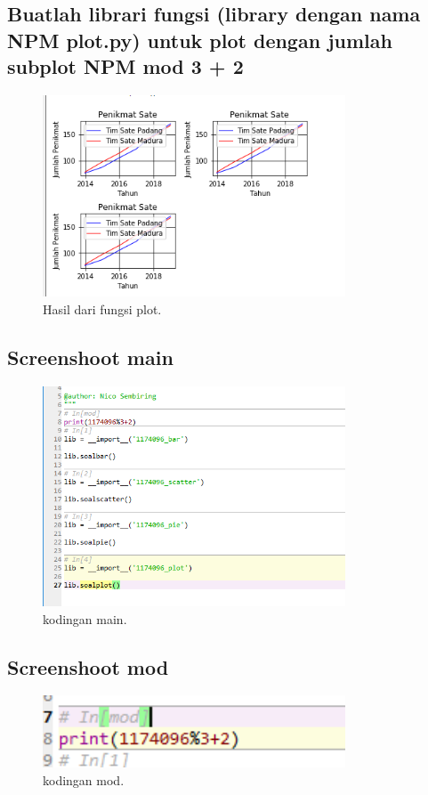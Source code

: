 \subsection{Buatlah librari fungsi (library dengan nama NPM plot.py) untuk plot dengan jumlah subplot NPM mod 3 + 2}

\begin{figure}[H]
	\includegraphics[width=9cm]{figures/6/Praktek/1174056/plot.png}
	\caption{Hasil dari fungsi plot.}
	\centering
\end{figure}

\subsection{Screenshoot main}
\begin{figure}[H]
	\includegraphics[width=9cm]{figures/6/Praktek/1174056/kodinganmain.png}
	\caption{kodingan main.}
	\centering
\end{figure}

\subsection{Screenshoot mod}
\begin{figure}[H]
	\includegraphics[width=9cm]{figures/6/Praktek/1174056/kodingmod.png}
	\caption{kodingan mod.}
	\centering
\end{figure}

